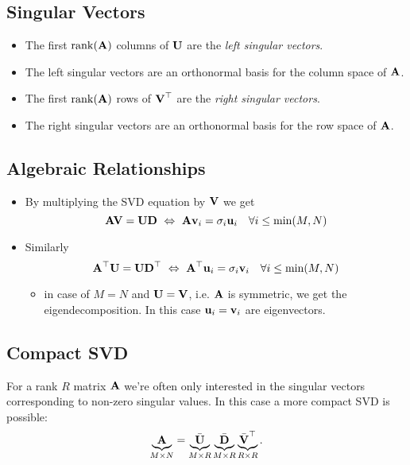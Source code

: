 \subsection{Singular Vectors}
\begin{itemize}
\item The first \(\operatorname{rank}(\boldsymbol{\mathrm{A}})\) columns of \(\boldsymbol{\mathrm{U}}\) are the \textit{left singular vectors}.
\item The left singular vectors are an orthonormal basis for the column space of \(\boldsymbol{\mathrm{A}}\).
\item The first \(\operatorname{rank}(\boldsymbol{\mathrm{A}})\) rows of \(\boldsymbol{\mathrm{V}}^\top\) are the \textit{right singular vectors}.
\item The right singular vectors are an orthonormal basis for the row space of \(\boldsymbol{\mathrm{A}}\).
\end{itemize}

\subsection{Algebraic Relationships}
\begin{itemize}
\item By multiplying the SVD equation by \(\boldsymbol{\mathrm{V}}\) we get \[
\matr{AV} = \matr{UD} \ \Leftrightarrow \ \matr{A} \matr{v}_i = \sigma_i \matr{u}_i \quad \forall i \leq \min(M,N)
\]

\item Similarly \[
\boldsymbol{\mathrm{A}}^\top \boldsymbol{\mathrm{U}} = \boldsymbol{\mathrm{U}} \boldsymbol{\mathrm{D}}^\top \ \Leftrightarrow \ \boldsymbol{\mathrm{A}}^\top \boldsymbol{\mathrm{u}}_i = \sigma_i \boldsymbol{\mathrm{v}}_i \quad \forall i \leq \min(M, N)
\]

\begin{itemize}
\item in case of \(M = N\) and \(\boldsymbol{\mathrm{U}} = \boldsymbol{\mathrm{V}}\), i.e. \(\boldsymbol{\mathrm{A}}\) is symmetric, we get the eigendecomposition. In this case \(\boldsymbol{\mathrm{u}}_i = \boldsymbol{\mathrm{v}}_i\) are eigenvectors.
\end{itemize}
\end{itemize}

\subsection{Compact SVD}
For a rank \(R\) matrix \(\boldsymbol{\mathrm{A}}\) we're often only interested in the singular vectors corresponding to non-zero singular values. In this case a more compact SVD is possible: \[
\underbrace{\boldsymbol{\mathrm{A}}}_{M \times N} = \underbrace{\bar{\boldsymbol{\mathrm{U}}}}_{M \times R} \underbrace{\bar{\boldsymbol{\mathrm{D}}}}_{M \times R} \underbrace{\bar{\boldsymbol{\mathrm{V}}}^\top}_{R \times R}.
\]


